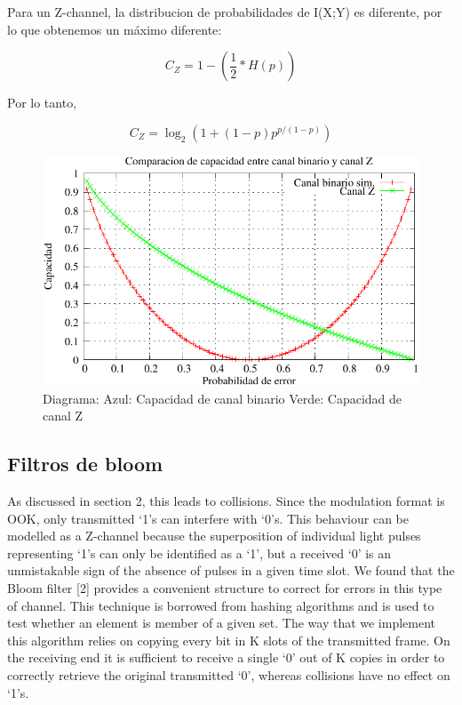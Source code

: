 Para un Z-channel, la distribucion de probabilidades de I(X;Y) es diferente, por lo que obtenemos un máximo diferente:

$$ C_{Z} = 1 - \left(\frac{1}{2}*H(p)\right) $$ \cite{tallini}

Por lo tanto,

$$ C_{Z} = \log_2\left(1+(1-p) p^{p/(1-p)}\right) $$


\begin{figure}[th]
  \begin{center}
    \includegraphics[scale=0.9]{capacidad/comparacionBZ}
  \end{center}
  \caption{Diagrama: Azul: Capacidad de canal binario Verde: Capacidad de canal Z}
  \label{fig:CompBZ}
\end{figure}


\subsection{Filtros de bloom}
As discussed in section 2, this leads to collisions. Since the modulation format is OOK, only transmitted ‘1’s can interfere with ‘0’s.
This behaviour can be modelled as a Z-channel because the superposition of individual light pulses representing ‘1’s
can only be identified as a ‘1’, but a received ‘0’ is an unmistakable sign of the absence of pulses in a given time slot.
We found that the Bloom filter [2] provides a convenient structure to correct for errors in this type of channel. This
technique is borrowed from hashing algorithms and is used to test whether an element is member of a given set. The
way that we implement this algorithm relies on copying every bit in K slots of the transmitted frame. On the receiving
end it is sufficient to receive a single ‘0’ out of K copies in order to correctly retrieve the original transmitted ‘0’,
whereas collisions have no effect on ‘1’s.

